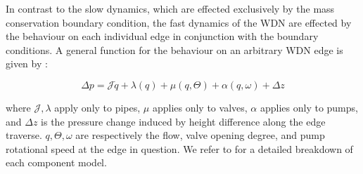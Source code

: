 In contrast to the slow dynamics, which are effected exclusively by the mass conservation boundary condition, the fast dynamics of the WDN are effected by the behaviour on each individual edge in conjunction with the boundary conditions. A general function for the behaviour on an arbitrary WDN edge is given by \cite{Rathore1030}:

\begin{equation}\label{eq:GeneralEdgeModel}
	\Delta p = \mathcal{J}\dot{q} + \lambda(q) + \mu(q,\Theta) + \alpha(q,\omega) + \Delta z
\end{equation}

where $\mathcal{J},\lambda$ apply only to pipes, $\mu$ applies only to valves, $\alpha$ applies only to pumps, and $\Delta z$ is the pressure change induced by height difference along the edge traverse. $q,\Theta,\omega$ are respectively the flow, valve opening degree, and pump rotational speed at the edge in question. We refer to \cite{MathiasBjarni2015,KallesoePhD} for a detailed breakdown of each component model.

%
%
%

